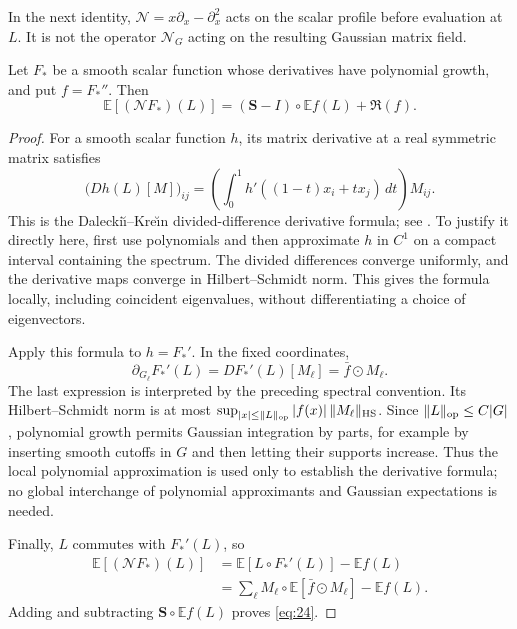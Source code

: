 In the next identity, \(\mathcal N=x\partial_x-\partial_x^2\) acts on
the scalar profile before evaluation at \(L\). It is not the operator
\(\mathcal N_G\) acting on the resulting Gaussian matrix field.

\begin{lemma}\label{lem:linear-spectral-identity}
Let \(F_*\) be a smooth scalar function whose derivatives have polynomial
growth, and put \(f=F_*''\).  Then
\[
 \mathbb E[(\mathcal N F_*)(L)]
       =(\mathbf S-I)\circ\mathbb E f(L)+\mathfrak R(f).
 \tag{24}\label{eq:24}
\]
\end{lemma}

\begin{proof}
For a smooth scalar function \(h\), its matrix derivative at a real
symmetric matrix satisfies
\[
 \bigl(Dh(L)[M]\bigr)_{ij}
   =\left(\int_0^1 h'((1-t)x_i+tx_j)\,dt\right)M_{ij}.
\]
This is the Dalecki\u{\i}--Kre\u{\i}n divided-difference derivative formula; see
\cite[Theorem~2.11]{Noferini2017}.  To justify it directly here, first use
polynomials and then approximate \(h\) in \(C^1\) on a compact interval
containing the spectrum.  The divided differences converge uniformly, and
the derivative maps converge in Hilbert--Schmidt norm.  This gives the
formula locally, including coincident eigenvalues, without differentiating
a choice of eigenvectors.

Apply this formula to \(h=F_*'\).  In the fixed coordinates,
\[
 \partial_{G_\ell}F_*'(L)=DF_*'(L)[M_\ell]
                         =\bar f\odot M_\ell.
\]
The last expression is interpreted by the preceding spectral convention.
Its Hilbert--Schmidt norm is at most
\(\sup_{|x|\le\|L\|_{\rm op}}|f(x)|\,\|M_\ell\|_{\rm HS}\).
Since \(\|L\|_{\rm op}\le C|G|\), polynomial growth permits Gaussian
integration by parts, for example by inserting smooth cutoffs in \(G\)
and then letting their supports increase.  Thus the local polynomial
approximation is used only to establish the derivative formula; no global
interchange of polynomial approximants and Gaussian expectations is needed.

Finally, \(L\) commutes with \(F_*'(L)\), so
\[
 \begin{aligned}
 \mathbb E[(\mathcal N F_*)(L)]
 &=\mathbb E[L\circ F_*'(L)]-\mathbb E f(L)\\
 &=\sum_\ell M_\ell\circ
           \mathbb E[\bar f\odot M_\ell]-\mathbb E f(L).
 \end{aligned}
\]
Adding and subtracting \(\mathbf S\circ\mathbb E f(L)\) proves
\eqref{eq:24}.
\end{proof}

